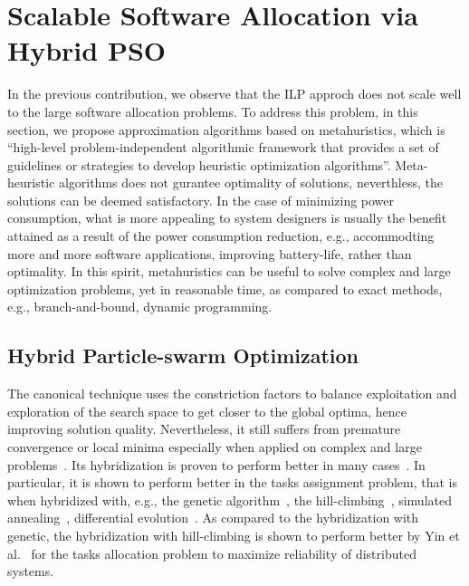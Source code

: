 \section{Scalable Software Allocation via Hybrid PSO}
In the previous contribution, we observe that the ILP approch does not scale well to the large software allocation problems. To address this problem, in this section, we propose approximation algorithms based on metahuristics, which is ``high-level problem-independent algorithmic framework that provides a set of guidelines or strategies to develop heuristic optimization algorithms''. Meta-heuristic algorithms does not gurantee optimality of solutions, neverthless, the solutions can be deemed satisfactory. In the case of minimizing power consumption, what is more appealing to system designers is usually the benefit attained as a result of the power consumption reduction, e.g., accommodting more and more software applications, improving battery-life, rather than optimality. In this spirit, metahuristics can be useful to solve complex and large optimization problems, yet in reasonable time, as compared to exact methods, e.g., branch-and-bound, dynamic programming.

\subsection{Hybrid Particle-swarm Optimization}
The canonical \pso{} technique uses the constriction factors to balance exploitation and exploration of the search space to get closer to the global optima, hence improving solution quality. Nevertheless, it still suffers from premature convergence or local minima especially when applied on complex and large problems~\cite{Rini2011ParticleChallenges}. Its hybridization is proven to perform better in many cases~\cite{Sengupta2018ParticlePerspectives}. In particular, it is shown to perform better in the tasks assignment problem, that is when hybridized with, e.g., the genetic algorithm~\cite{Sailer2013OptimizingAUTOSAR}, the hill-climbing~\cite{yin2007task}, simulated annealing~\cite{Zhao2007ASystem}, differential evolution~\cite{Tasgetiren2006AProblem}. As compared to the hybridization with genetic, the hybridization with hill-climbing \hcpso{} is shown to perform better by Yin et al.~\cite{yin2007task} for the tasks allocation problem to maximize reliability of distributed systems. 

